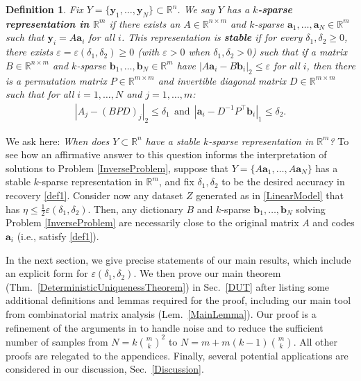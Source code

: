 \documentclass[journal, twocolumn]{IEEEtran}
\newtheorem{definition}{Definition}
\begin{document}
\begin{definition}\label{Uniqueness}
Fix $Y = \{ \mathbf{y}_1, \ldots, \mathbf{y}_N\} \subset \mathbb{R}^n$. We say $Y$ has a \textbf{$k$-sparse representation in $\mathbb{R}^m$} if there exists an $A \in \mathbb{R}^{n \times m}$ and $k$-sparse $\mathbf{a}_1, \ldots, \mathbf{a}_N \in \mathbb{R}^m$ such that $\mathbf{y}_i = A\mathbf{a}_i$ for all $i$. This representation is \textbf{stable} if for every $\delta_1, \delta_2 \geq 0$, there exists $\varepsilon = \varepsilon(\delta_1, \delta_2) \geq 0$ (with $\varepsilon > 0$ when  $\delta_1, \delta_2 > 0$) such that if a matrix $B \in \mathbb{R}^{n \times m}$ and $k$-sparse $\mathbf{b}_1, \ldots, \mathbf{b}_N \in \mathbb{R}^m$ have \mbox{$|A\mathbf{a}_i - B\mathbf{b}_i|_2 \leq \varepsilon$} for all $i$, then there is a permutation matrix $P \in \mathbb{R}^{m \times m}$ and invertible diagonal matrix $D \in \mathbb{R}^{m \times m}$ such that for all $i = 1,\ldots,N$ and $j = 1,\ldots,m$:
\begin{align}\label{def1}
|A_j - (BPD)_j|_2 \leq \delta_1 \ \ \text{and} \ \ |\mathbf{a}_i - D^{-1}P^{\top}\mathbf{b}_i|_1 \leq \delta_2.
\end{align}
\end{definition}

We ask here: \emph{When does $Y \subset \mathbb{R}^n$ have a stable $k$-sparse representation in $\mathbb{R}^m$?} To see how an affirmative answer to this question informs the interpretation of solutions to Problem \ref{InverseProblem}, suppose that \mbox{$Y = \{A \mathbf{a}_1, \ldots, A\mathbf{a}_N\}$} has a stable $k$-sparse representation in $\mathbb R^m$, and fix $\delta_1, \delta_2$ to be the desired accuracy in recovery \eqref{def1}. Consider now any dataset $Z$ generated as in \eqref{LinearModel} that has $\eta \leq \frac{1}{2} \varepsilon(\delta_1, \delta_2)$. Then, any dictionary $B$ and $k$-sparse $\mathbf{b}_1, \ldots, \mathbf{b}_N$ solving Problem \ref{InverseProblem} are necessarily close to the original matrix $A$ and codes $\mathbf{a}_i$ (i.e., satisfy \eqref{def1}).  

In the next section, we give precise statements of our main results, which include an explicit form for $\varepsilon(\delta_1, \delta_2)$. We then prove our main theorem (Thm.~\ref{DeterministicUniquenessTheorem}) in Sec.~\ref{DUT} after listing some additional definitions and lemmas required for the proof, including our main tool from combinatorial matrix analysis (Lem.~\ref{MainLemma}). Our proof is a refinement of the arguments in \cite{Hillar15} to handle noise and to reduce the sufficient number of samples from $N=k{m \choose k}^2$ to $N = m + m(k-1){m \choose k}$. All other proofs are relegated to the appendices. Finally, several potential applications are considered in our discussion, Sec.~\ref{Discussion}.
\end{document}
